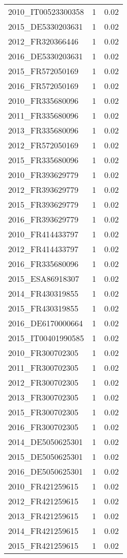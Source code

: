 \begin{table*}[htbp]
\begin{tabular}{lrr}
2010_IT00523300358 & 1 & 0.02 \\
2015_DE5330203631 & 1 & 0.02 \\
2012_FR320366446 & 1 & 0.02 \\
2016_DE5330203631 & 1 & 0.02 \\
2015_FR572050169 & 1 & 0.02 \\
2016_FR572050169 & 1 & 0.02 \\
2010_FR335680096 & 1 & 0.02 \\
2011_FR335680096 & 1 & 0.02 \\
2013_FR335680096 & 1 & 0.02 \\
2012_FR572050169 & 1 & 0.02 \\
2015_FR335680096 & 1 & 0.02 \\
2010_FR393629779 & 1 & 0.02 \\
2012_FR393629779 & 1 & 0.02 \\
2015_FR393629779 & 1 & 0.02 \\
2016_FR393629779 & 1 & 0.02 \\
2010_FR414433797 & 1 & 0.02 \\
2012_FR414433797 & 1 & 0.02 \\
2016_FR335680096 & 1 & 0.02 \\
2015_ESA86918307 & 1 & 0.02 \\
2014_FR430319855 & 1 & 0.02 \\
2015_FR430319855 & 1 & 0.02 \\
2016_DE6170000664 & 1 & 0.02 \\
2015_IT00401990585 & 1 & 0.02 \\
2010_FR300702305 & 1 & 0.02 \\
2011_FR300702305 & 1 & 0.02 \\
2012_FR300702305 & 1 & 0.02 \\
2013_FR300702305 & 1 & 0.02 \\
2015_FR300702305 & 1 & 0.02 \\
2016_FR300702305 & 1 & 0.02 \\
2014_DE5050625301 & 1 & 0.02 \\
2015_DE5050625301 & 1 & 0.02 \\
2016_DE5050625301 & 1 & 0.02 \\
2010_FR421259615 & 1 & 0.02 \\
2012_FR421259615 & 1 & 0.02 \\
2013_FR421259615 & 1 & 0.02 \\
2014_FR421259615 & 1 & 0.02 \\
2015_FR421259615 & 1 & 0.02 \\

\end{tabular}
\end{table*}
